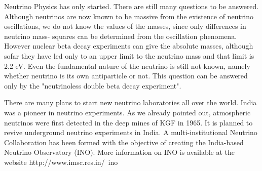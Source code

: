 Neutrino Physics has only started. There are still many questions
to be answered. Although neutrinos are now known to be massive
from the existence of neutrino oscillations, we do not know the
values of the masses, since only differences in neutrino mass-
squares can be determined from the oscillation phenomena. 
However nuclear beta decay experiments can give the absolute
masses, although sofar they have led only to an upper limit to the
neutrino mass and that limit is 2.2 eV.
Even the fundamental nature of the
neutrino is still not known, namely whether neutrino is its
own antiparticle or not. This question can be answered only
by the "neutrinoless double beta decay experiment". 

There are many plans to start new neutrino laboratories all over
the world. India was a pioneer in neutrino experiments. As we
already pointed out, atmospheric neutrinos were first detected
in the deep mines of KGF in 1965. It is planned to revive 
underground neutrino experiments in India. A multi-institutional
Neutrino Collaboration has been formed with the objective of
creating the India-based Neutrino Observatory (INO). More
information on INO is available at the website http://www.imsc.res.in/~ino
